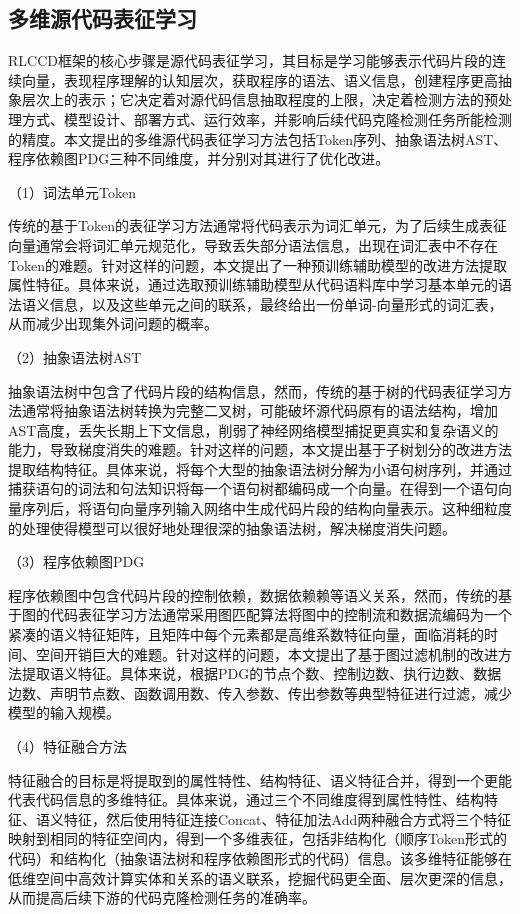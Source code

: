 \subsection{多维源代码表征学习}
\label{subsec:Representation}
RLCCD框架的核心步骤是源代码表征学习，其目标是学习能够表示代码片段的连续向量，表现程序理解的认知层次，获取程序的语法、语义信息，创建程序更高抽象层次上的表示；它决定着对源代码信息抽取程度的上限，决定着检测方法的预处理方式、模型设计、部署方式、运行效率，并影响后续代码克隆检测任务所能检测的精度。本文提出的多维源代码表征学习方法包括Token序列、抽象语法树AST、程序依赖图PDG三种不同维度，并分别对其进行了优化改进。

（1）词法单元Token

传统的基于Token的表征学习方法通常将代码表示为词汇单元，为了后续生成表征向量通常会将词汇单元规范化，导致丢失部分语法信息，出现在词汇表中不存在Token的难题。针对这样的问题，本文提出了一种预训练辅助模型的改进方法提取属性特征。具体来说，通过选取预训练辅助模型从代码语料库中学习基本单元的语法语义信息，以及这些单元之间的联系，最终给出一份单词-向量形式的词汇表，从而减少出现集外词问题的概率。

（2）抽象语法树AST

抽象语法树中包含了代码片段的结构信息，然而，传统的基于树的代码表征学习方法通常将抽象语法树转换为完整二叉树，可能破坏源代码原有的语法结构，增加AST高度，丢失长期上下文信息，削弱了神经网络模型捕捉更真实和复杂语义的能力，导致梯度消失的难题。针对这样的问题，本文提出基于子树划分的改进方法提取结构特征。具体来说，将每个大型的抽象语法树分解为小语句树序列，并通过捕获语句的词法和句法知识将每一个语句树都编码成一个向量。在得到一个语句向量序列后，将语句向量序列输入网络中生成代码片段的结构向量表示。这种细粒度的处理使得模型可以很好地处理很深的抽象语法树，解决梯度消失问题。

（3）程序依赖图PDG

程序依赖图中包含代码片段的控制依赖，数据依赖赖等语义关系，然而，传统的基于图的代码表征学习方法通常采用图匹配算法将图中的控制流和数据流编码为一个紧凑的语义特征矩阵，且矩阵中每个元素都是高维系数特征向量，面临消耗的时间、空间开销巨大的难题。针对这样的问题，本文提出了基于图过滤机制的改进方法提取语义特征。具体来说，根据PDG的节点个数、控制边数、执行边数、数据边数、声明节点数、函数调用数、传入参数、传出参数等典型特征进行过滤，减少模型的输入规模。

（4）特征融合方法

特征融合的目标是将提取到的属性特性、结构特征、语义特征合并，得到一个更能代表代码信息的多维特征。具体来说，通过三个不同维度得到属性特性、结构特征、语义特征，然后使用特征连接Concat、特征加法Add两种融合方式将三个特征映射到相同的特征空间内，得到一个多维表征，包括非结构化（顺序Token形式的代码）和结构化（抽象语法树和程序依赖图形式的代码）信息。该多维特征能够在低维空间中高效计算实体和关系的语义联系，挖掘代码更全面、层次更深的信息，从而提高后续下游的代码克隆检测任务的准确率。

